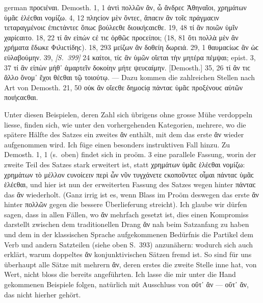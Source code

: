 \begin{otherlanguage*}{german}
προϲιέναι. Demosth. 1, 1 ἀντὶ πολλῶν ἄν, ὦ ἄνδρεϲ Ἀθηναῖοι, χρημάτων ὑμᾶϲ ἑλέϲθαι νομίζω. 4, 12 πληϲίον μὲν ὄντεϲ, ἅπαϲιν ἂν τοῖϲ πράγμαϲιν τεταραγμένοιϲ ἐπιϲτάντεϲ ὅπωϲ βούλεϲθε διοικήϲαιϲθε. 19, 48 τί ἂν ποιῶν ὑμῖν χαρίϲαιτο. 18, 22 τί ἂν εἰπών ϲέ τιϲ ὀρθῶϲ προϲείποι; (18, 81 ὅτι πολλὰ μὲν ἂν χρήματα ἔδωκε Φιλιϲτίδηϲ). 18, 293 μείζων ἂν δοθείη δωρειά. 29, 1 θαυμαϲίωϲ ἂν ὡϲ εὐλαβούμην. 39, \hypertarget{p399}{\emph{[S.~399]}}\label{p399} 24 καίτοι, τίϲ ἂν ὑμῶν οἴεται τὴν μητέρα πέμψαι; epist. 3, 37 τί ἂν εἰπὼν μήθ᾽ ἁμαρτεῖν δοκοίην μήτε ψευϲαίμην. [Demosth.] 35, 26 τί ἄν τιϲ ἄλλο ὄνομ᾽ ἔχοι θέϲθαι τῷ τοιούτῳ. — Dazu kommen die zahlreichen Stellen nach Art von Demosth. 21, 50 οὐκ ἂν οἴεϲθε δημοϲίᾳ πάνταϲ ὑμᾶϲ προξένουϲ αὑτῶν ποιήϲαϲθαι. 

Unter diesen Beispielen, deren Zahl sich übrigens ohne grosse Mühe verdoppeln liesse, finden sich, wie unter den vorhergehenden Kategorien, mehrere, wo die spätere Hälfte des Satzes ein zweites ἄν enthält, mit dem das erste ἄν wieder aufgenommen wird. Ich füge einen besonders instruktiven Fall hinzu. Zu Demosth. 1, 1 (s.~oben) findet sich in proöm. 3 eine parallele Fassung, worin der zweite Teil des Satzes stark erweitert ist, statt χρημάτων ὑμᾶϲ ἑλέϲθαι νομίζω: χρημάτων τὸ μέλλον ϲυνοίϲειν περὶ ὧν νῦν τυγχάνετε ϲκοποῦντεϲ οἶμαι πάνταϲ ὑμᾶϲ ἑλέϲθαι, und hier ist nun der erweiterten Fassung des Satzes wegen hinter πάνταϲ das ἄν wiederholt. (Ganz irrig ist es, wenn Blass im Proöm deswegen das erste ἄν hinter πολλῶν gegen die bessere Überlieferung streicht). Ich glaube wir dürfen sagen, dass in allen Fällen, wo ἄν mehrfach gesetzt ist, dies einen Kompromiss darstellt zwischen dem traditionellen Drang ἄν nah beim Satzanfang zu haben und dem in der klassischen Sprache aufgekommenen Bedürfnis die Partikel dem Verb und andern Satzteilen (siehe oben S.~393) anzunähern: wodurch sich auch erklärt, warum doppeltes ἄν konjunktivischen Sätzen fremd ist. So sind für uns überhaupt alle Sätze mit mehrern ἄν, deren erstes die zweite Stelle inne hat, von Wert, nicht bloss die bereits angeführten. Ich lasse die mir unter die Hand gekommenen Beispiele folgen, natürlich mit Ausschluss von οὔτ᾽ ἄν — οὔτ᾽ ἄν, das nicht hierher gehört.


\end{otherlanguage*}
